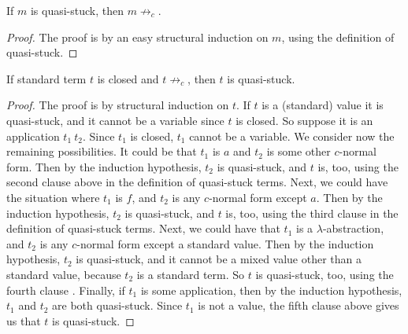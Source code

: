 \documentclass{LMCS}
\begin{document}
\begin{lem}
\label{lem:qsnf}
If $m$ is quasi-stuck, then $m\not\to_c$.
\end{lem}
\begin{proof} The proof is by an easy structural induction on $m$, 
using the definition of quasi-stuck. 
\end{proof}

\begin{lem}
\label{lem:qsnfb}
If standard term $t$ is closed and $t\not\to_c$, then $t$ is
quasi-stuck.
\end{lem}
\begin{proof}
The proof is by structural induction on $t$.  If $t$ is
a (standard) value it is quasi-stuck, and it cannot be a variable
since $t$ is closed.  So suppose it is an application $t_1\ t_2$.
Since $t_1$ is closed, $t_1$ cannot be a variable.  We consider now
the remaining possibilities.  It could be that $t_1$ is $a$ and $t_2$
is some other $c$-normal form.  Then by the induction hypothesis,
$t_2$ is quasi-stuck, and $t$ is, too, using the second clause above
in the definition of quasi-stuck terms.  Next, we could have the
situation where $t_1$ is $f$, and $t_2$ is any $c$-normal form except
$a$.  Then by the induction hypothesis, $t_2$ is quasi-stuck, and $t$
is, too, using the third clause in the definition of quasi-stuck
terms.  Next, we could have that $t_1$ is a $\lambda$-abstraction, and
$t_2$ is any $c$-normal form except a standard value.  Then by the
induction hypothesis, $t_2$ is quasi-stuck, and it cannot be a mixed
value other than a standard value, because $t_2$ is a standard term.
So $t$ is quasi-stuck, too, using the fourth clause .  Finally, if
$t_1$ is some application, then by the induction hypothesis, $t_1$ and
$t_2$ are both quasi-stuck.  Since $t_1$ is not a value, the fifth
clause above gives us that $t$ is quasi-stuck. 
\end{proof}
\end{document}
